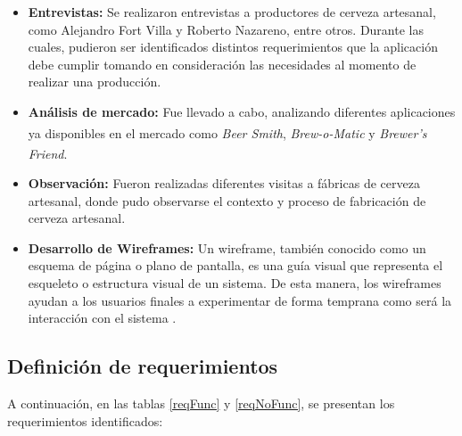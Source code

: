     \begin{itemize}
        
        \item \textbf{Entrevistas:} Se realizaron entrevistas a productores de cerveza artesanal, como Alejandro Fort Villa y Roberto Nazareno, entre otros. Durante las cuales, pudieron ser identificados distintos requerimientos que la aplicación debe cumplir tomando en consideración las necesidades al momento de realizar una producción. 
        
        \item \textbf{Análisis de mercado:} Fue llevado a cabo, analizando diferentes aplicaciones ya disponibles en el mercado como \textit{Beer Smith}\textsuperscript{\textregistered}, \textit{Brew-o-Matic}\textsuperscript{\textregistered} y \textit{Brewer’s Friend}\textsuperscript{\textregistered}.
        
        \item \textbf{Observación:} Fueron realizadas diferentes visitas a fábricas de cerveza artesanal, donde pudo observarse el contexto y proceso de fabricación de cerveza artesanal.
        
        \item \textbf{Desarrollo de Wireframes:} Un wireframe, también conocido como un esquema de página o plano de pantalla, es una guía visual que representa el esqueleto o estructura visual de un sistema. De esta manera, los wireframes ayudan a los usuarios finales a experimentar de forma temprana como será la interacción con el sistema \cite{Garr11}.
        
    \end{itemize}
    
    \subsection{Definición de requerimientos}
    \par
    A continuación, en las tablas \ref{reqFunc} y \ref{reqNoFunc}, se presentan los requerimientos identificados:
 
